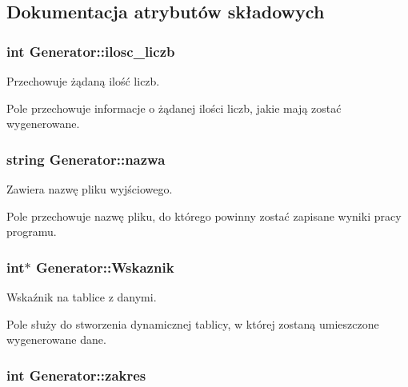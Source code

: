 \subsection{\-Dokumentacja atrybutów składowych}
\hypertarget{class_generator_a51417dbd6cecb8850e95fab3072f2992}{
\subsubsection[{ilosc\-\_\-liczb}]{\setlength{\rightskip}{0pt plus 5cm}int {\bf \-Generator\-::ilosc\-\_\-liczb}}}\label{class_generator_a51417dbd6cecb8850e95fab3072f2992}


\-Przechowuje żądaną ilość liczb. 

\-Pole przechowuje informacje o żądanej ilości liczb, jakie mają zostać wygenerowane. \hypertarget{class_generator_a1078fe2b2f7b36489d24020e8d454b34}{
\subsubsection[{nazwa}]{\setlength{\rightskip}{0pt plus 5cm}string {\bf \-Generator\-::nazwa}}}\label{class_generator_a1078fe2b2f7b36489d24020e8d454b34}


\-Zawiera nazwę pliku wyjściowego. 

\-Pole przechowuje nazwę pliku, do którego powinny zostać zapisane wyniki pracy programu. \hypertarget{class_generator_afea06b61eed9b34cd983ab81f57f9d65}{
\subsubsection[{\-Wskaznik}]{\setlength{\rightskip}{0pt plus 5cm}int$\ast$ {\bf \-Generator\-::\-Wskaznik}}}\label{class_generator_afea06b61eed9b34cd983ab81f57f9d65}


\-Wskaźnik na tablice z danymi. 

\-Pole służy do stworzenia dynamicznej tablicy, w której zostaną umieszczone wygenerowane dane. \hypertarget{class_generator_aad1c837275dd1ee921eabf25118cb2a9}{
\subsubsection[{zakres}]{\setlength{\rightskip}{0pt plus 5cm}int {\bf \-Generator\-::zakres}}}\label{class_generator_aad1c837275dd1ee921eabf25118cb2a9}


